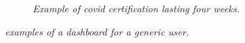 \begin{figure}[h]
\begin{subfigure}{.5\textwidth}
  \caption{\textit{Example of covid certification lasting four weeks.}}
  \label{fig:covid_certification}
\end{subfigure}
\caption{\textit{examples of a dashboard for a generic user.}}
\end{figure}
